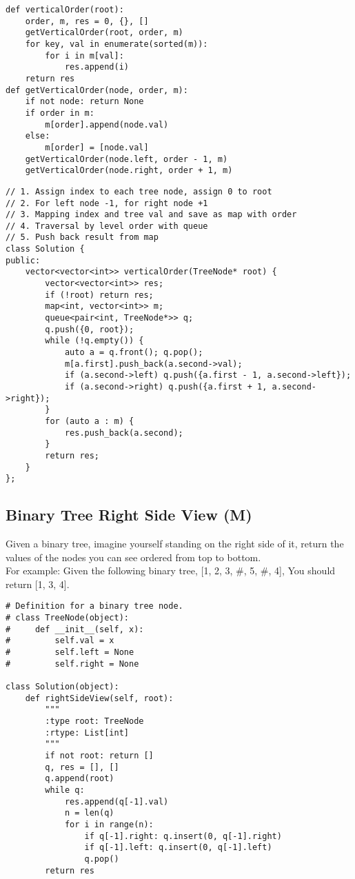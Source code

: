 \begin{lstlisting}
def verticalOrder(root):
	order, m, res = 0, {}, []
	getVerticalOrder(root, order, m)
	for key, val in enumerate(sorted(m)):
		for i in m[val]:
			res.append(i)
	return res
def getVerticalOrder(node, order, m):
	if not node: return None
	if order in m:
		m[order].append(node.val)
	else:
		m[order] = [node.val]
	getVerticalOrder(node.left, order - 1, m)
	getVerticalOrder(node.right, order + 1, m)
\end{lstlisting}


\begin{lstlisting}
// 1. Assign index to each tree node, assign 0 to root
// 2. For left node -1, for right node +1
// 3. Mapping index and tree val and save as map with order
// 4. Traversal by level order with queue
// 5. Push back result from map
class Solution {
public:
    vector<vector<int>> verticalOrder(TreeNode* root) {
        vector<vector<int>> res;
        if (!root) return res;
        map<int, vector<int>> m;
        queue<pair<int, TreeNode*>> q;
        q.push({0, root});
        while (!q.empty()) {
            auto a = q.front(); q.pop();
            m[a.first].push_back(a.second->val);
            if (a.second->left) q.push({a.first - 1, a.second->left});
            if (a.second->right) q.push({a.first + 1, a.second->right});
        }
        for (auto a : m) {
            res.push_back(a.second);
        }
        return res;
    }
};
\end{lstlisting}


\subsection{Binary Tree Right Side View (M)}
Given a binary tree, imagine yourself standing on the right side of it, return the values of the nodes you can see ordered from top to bottom. \\

For example: Given the following binary tree, [1, 2, 3, \#, 5, \#, 4], You should return [1, 3, 4]. \\

\begin{lstlisting}
# Definition for a binary tree node.
# class TreeNode(object):
#     def __init__(self, x):
#         self.val = x
#         self.left = None
#         self.right = None

class Solution(object):
    def rightSideView(self, root):
        """
        :type root: TreeNode
        :rtype: List[int]
        """
        if not root: return []
        q, res = [], []
        q.append(root)
        while q:
            res.append(q[-1].val)
            n = len(q)
            for i in range(n):
                if q[-1].right: q.insert(0, q[-1].right)
                if q[-1].left: q.insert(0, q[-1].left)
                q.pop()
        return res
\end{lstlisting}

